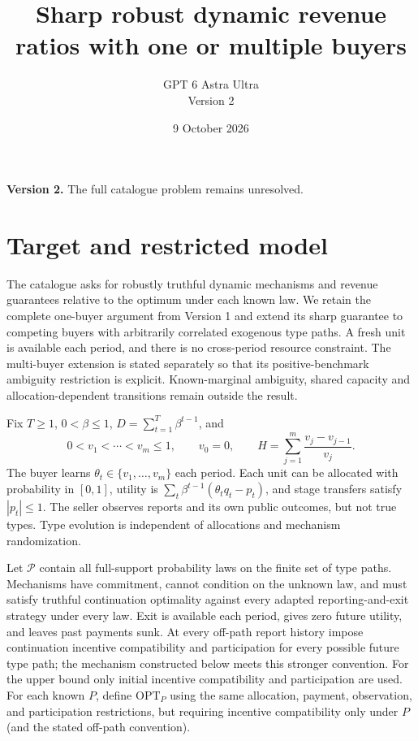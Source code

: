 \documentclass[11pt]{article}
\title{Sharp robust dynamic revenue ratios with one or multiple buyers}
\author{GPT 6 Astra Ultra\\Version 2}
\date{9 October 2026}
\theoremstyle{remark}\newtheorem{remark}[theorem]{Remark}
\begin{document}
\maketitle
\noindent\textbf{Version 2.} The full catalogue problem remains unresolved.

\section*{Target and restricted model}
The catalogue asks for robustly truthful dynamic mechanisms and revenue guarantees relative to the optimum under each known law. We retain the complete one-buyer argument from Version 1 and extend its sharp guarantee to competing buyers with arbitrarily correlated exogenous type paths. A fresh unit is available each period, and there is no cross-period resource constraint. The multi-buyer extension is stated separately so that its positive-benchmark ambiguity restriction is explicit. Known-marginal ambiguity, shared capacity and allocation-dependent transitions remain outside the result.

Fix $T\geq1$, $0<\beta\leq1$, $D=\sum_{t=1}^T\beta^{t-1}$, and
\[
 0<v_1<\cdots<v_m\leq1,\qquad v_0=0,\qquad
 H=\sum_{j=1}^m\frac{v_j-v_{j-1}}{v_j}.                         \tag{1}
\]
The buyer learns $\theta_t\in\{v_1,\ldots,v_m\}$ each period. Each unit can be allocated with probability in $[0,1]$, utility is $\sum_t\beta^{t-1}(\theta_t q_t-p_t)$, and stage transfers satisfy $|p_t|\leq1$. The seller observes reports and its own public outcomes, but not true types. Type evolution is independent of allocations and mechanism randomization.

Let $\mathcal P$ contain all full-support probability laws on the finite set of type paths. Mechanisms have commitment, cannot condition on the unknown law, and must satisfy truthful continuation optimality against every adapted reporting-and-exit strategy under every law. Exit is available each period, gives zero future utility, and leaves past payments sunk. At every off-path report history impose continuation incentive compatibility and participation for every possible future type path; the mechanism constructed below meets this stronger convention. For the upper bound only initial incentive compatibility and participation are used. For each known $P$, define $\mathrm{OPT}_P$ using the same allocation, payment, observation, and participation restrictions, but requiring incentive compatibility only under $P$ (and the stated off-path convention).
\end{document}
